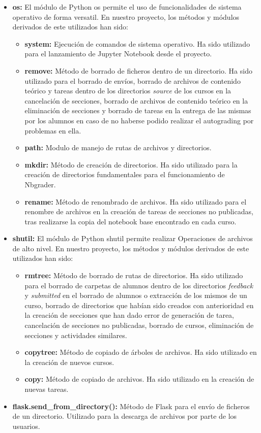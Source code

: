 \begin{itemize}
\item \textbf{os:} El módulo de Python os permite el uso de funcionalidades de sistema operativo de forma versatil. En nuestro proyecto, los métodos y módulos derivados de este utilizados han sido:
    \begin{itemize}
        \item \textbf{system:} Ejecución de comandos de sistema operativo. Ha sido utilizado para el lanzamiento de Jupyter Notebook desde el proyecto.
        \item \textbf{remove:} Método de borrado de ficheros dentro de un directorio. Ha sido utilizado para el borrado de envíos, borrado de archivos de contenido teórico y tareas dentro de los directorios \textit{source} de los cursos en la cancelación de secciones, borrado de archivos de contenido teórico en la eliminación de secciones y borrado de tareas en la entrega de las mismas por los alumnos en caso de no haberse podido realizar el autograding por problemas en ella.
        \item \textbf{path:} Modulo de manejo de rutas de archivos y directorios.
        \item \textbf{mkdir:} Método de creación de directorios. Ha sido utilizado para la creación de directorios fundamentales para el funcionamiento de Nbgrader.
        \item \textbf{rename:} Método de renombrado de archivos. Ha sido utilizado para el renombre de archivos en la creación de tareas de secciones no publicadas, tras realizarse la copia del notebook base encontrado en cada curso.
    \end{itemize}
\item \textbf{shutil:} El módulo de Python shutil permite realizar Operaciones de archivos de alto nivel. En nuestro proyecto, los métodos y módulos derivados de este utilizados han sido:
    \begin{itemize}
        \item \textbf{rmtree:} Método de borrado de rutas de directorios. Ha sido utilizado para el borrado de carpetas de alumnos dentro de los directorios \textit{feedback} y \textit{submitted} en el borrado de alumnos o extracción de los mismos de un curso, borrado de directorios que habían sido creados con anterioridad en la creación de secciones que han dado error de generación de tarea, cancelación de secciones no publicadas, borrado de cursos, eliminación de secciones y actividades similares.
        \item \textbf{copytree:} Método de copiado de árboles de archivos. Ha sido utilizado en la creación de nuevos cursos.
        \item \textbf{copy:} Método de copiado de archivos. Ha sido utilizado en la creación de nuevas tareas.
    \end{itemize}
\item \textbf{flask.send\_from\_directory():} Método de Flask para el envío de ficheros de un directorio. Utilizado para la descarga de archivos por parte de los usuarios.
\end{itemize}

